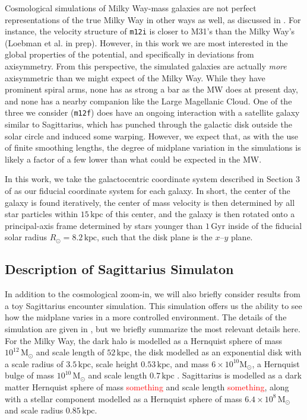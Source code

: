 \documentclass[twocolumn]{aastex62}
\newcommand{\Gus}[1]{\textcolor{red}{#1}}
\newcommand{\Msun}{\ensuremath{\text{M}_\odot}}
\newcommand{\kpc}{\text{kpc}}
\newcommand{\Gyr}{\text{Gyr}}
\newcommand{\mi}{\texttt{m12i}}
\newcommand{\mf}{\texttt{m12f}}
\begin{document}
Cosmological simulations of Milky Way-mass galaxies are not perfect
representations of the true Milky Way in other ways as well, as discussed in
\citet{2018arXiv180610564S}. For instance, the velocity structure of \mi{} is
closer to M31's than the Milky Way's (Loebman et al. in prep). However, in
this work we are most interested in the global properties of the potential,
and specifically in deviations from axisymmetry. From this perspective, the
simulated galaxies are actually \emph{more} axisymmetric than we might expect
of the Milky Way. While they have prominent spiral arms, none has as strong a
bar as the MW does at present day, and none has a nearby companion like the
Large Magellanic Cloud. One of the three we consider (\mf) does have an
ongoing interaction with a satellite galaxy similar to Sagittarius, which has
punched through the galactic disk outside the solar circle and induced some
warping. However, we expect that, as with the use of finite smoothing lengths,
the degree of midplane variation in the simulations is likely a factor of a
few lower than what could be expected in the MW.

In this work, we take the galactocentric coordinate system described in
Section 3 of \citet{2018arXiv180610564S} as our fiducial coordinate system for
each galaxy. In short, the center of the galaxy is found iteratively, the
center of mass velocity is then determined by all star particles within
$15\,\kpc$ of this center, and the galaxy is then rotated onto a
principal-axis frame determined by stars younger than $1\,\Gyr$ inside of the
fiducial solar radius $R_{\odot} = 8.2\,\kpc$, such that the disk plane is the
$x$--$y$ plane.

\subsection{Description of Sagittarius Simulaton} \label{ssec:sag_sim}
In addition to the cosmological zoom-in, we will also briefly consider results
from a toy Sagittarius encounter simulation. This simulation offers us the
ability to see how the midplane varies in a more controlled environment. The
details of the simulation are given in \citet{2018MNRAS.481..286L}, but we
briefly summarize the most relevant details here. For the Milky Way, the dark
halo is modelled as a Hernquist sphere of mass $10^{12}\,\Msun$ and scale
length of $52\,\kpc$, the disk modelled as an exponential disk with a scale
radius of $3.5\,\kpc$, scale height $0.53\,\kpc$, and mass
$6\times10^{10}\Msun$, a Hernquist bulge of mass $10^{10}\,\Msun$ and scale
length $0.7\,\kpc$ \citep{1990ApJ...356..359H}. Sagittarius is modelled as a
dark matter Hernquist sphere of mass \Gus{something} and scale length
\Gus{something}, along with a stellar component modelled as a Hernquist sphere
of mass $6.4\times10^8\,\Msun$ and scale radius $0.85\,\kpc$.
\end{document}
